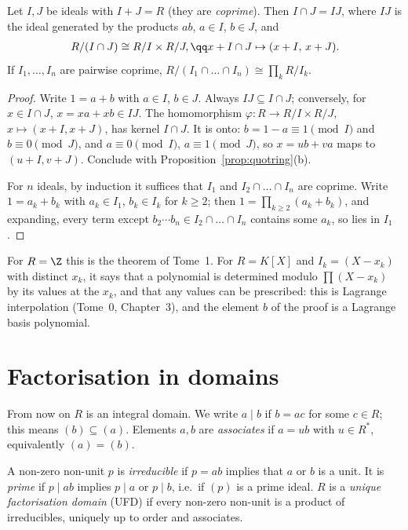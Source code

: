 \begin{theorem}\label{thm:crtring}
Let $I,J$ be ideals with $I+J=R$ (they are \emph{coprime}). Then $I\cap J=IJ$, where $IJ$ is the ideal generated by the products $ab$, $a\in I$, $b\in J$, and
\[
\begin{gathered}R/(I\cap J)\cong R/I\times R/J,\qq x+I\cap J\mapsto(x+I,\,x+J).\end{gathered}
\]
If $I_1,\dots,I_n$ are pairwise coprime, $R/(I_1\cap\dots\cap I_n)\cong\prod_kR/I_k$.
\end{theorem}
\begin{proof}
Write $1=a+b$ with $a\in I$, $b\in J$. Always $IJ\subseteq I\cap J$; conversely, for $x\in I\cap J$, $x=xa+xb\in IJ$. The homomorphism $\varphi:R\to R/I\times R/J$, $x\mapsto(x+I,x+J)$, has kernel $I\cap J$. It is onto: $b=1-a\equiv1\pmod I$ and $b\equiv0\pmod J$, and $a\equiv0\pmod I$, $a\equiv1\pmod J$, so $x=ub+va$ maps to $(u+I,v+J)$. Conclude with Proposition~\ref{prop:quotring}(b).

For $n$ ideals, by induction it suffices that $I_1$ and $I_2\cap\dots\cap I_n$ are coprime. Write $1=a_k+b_k$ with $a_k\in I_1$, $b_k\in I_k$ for $k\ge2$; then $1=\prod_{k\ge2}(a_k+b_k)$, and expanding, every term except $b_2\cdots b_n\in I_2\cap\dots\cap I_n$ contains some $a_k$, so lies in $I_1$.
\end{proof}

For $R=\Z$ this is the theorem of Tome~1. For $R=K[X]$ and $I_k=(X-x_k)$ with distinct $x_k$, it says that a polynomial is determined modulo $\prod(X-x_k)$ by its values at the $x_k$, and that any values can be prescribed: this is Lagrange interpolation (Tome~0, Chapter~3), and the element $b$ of the proof is a Lagrange basis polynomial.

\section{Factorisation in domains}

From now on $R$ is an integral domain. We write $a\mid b$ if $b=ac$ for some $c\in R$; this means $(b)\subseteq(a)$. Elements $a,b$ are \emph{associates} if $a=ub$ with $u\in R^*$, equivalently $(a)=(b)$.

\begin{definition}
A non-zero non-unit $p$ is \emph{irreducible} if $p=ab$ implies that $a$ or $b$ is a unit. It is \emph{prime} if $p\mid ab$ implies $p\mid a$ or $p\mid b$, i.e.\ if $(p)$ is a prime ideal. $R$ is a \emph{unique factorisation domain} (UFD) if every non-zero non-unit is a product of irreducibles, uniquely up to order and associates.
\end{definition}


